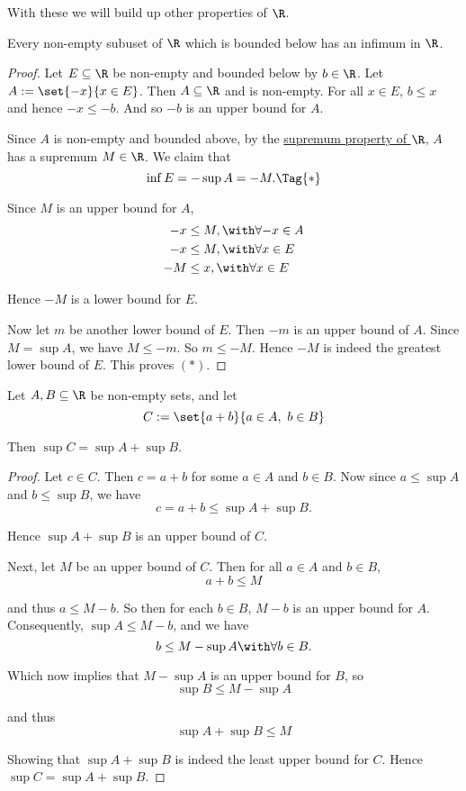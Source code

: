 With these we will build up other properties of $\R$.

\label{ab2a2fe}

Every non-empty subuset of $\R$ which is bounded below has an infimum in $\R$.

\begin{proof}

  Let $E\subseteq\R$ be non-empty and bounded below by $b\in\R$. Let
  $A:=\set{-x}{x\in E}$. Then $A\subseteq\R$ and is non-empty. For all $x\in E$,
  $b\leq x$ and hence $-x\leq-b$. And so $-b$ is an upper bound for $A$.

  Since $A$ is non-empty and bounded above, by the \href{f330cf9}{supremum
  property of $\R$}, $A$ has a supremum $M\in\R$. We claim that
  \begin{equation*}
    \inf E=-\sup A=-M.\Tag{*}
  \end{equation*}

  Since $M$ is an upper bound for $A$,
  \begin{align*}
    -x &\leq M,\with\forall{-x}\in A \\
    -x &\leq M,\with\forall{x}\in E  \\
    -M &\leq x,\with\forall{x}\in E
  \end{align*}

  Hence $-M$ is a lower bound for $E$.

  Now let $m$ be another lower bound of $E$. Then $-m$ is an upper bound of $A$.
  Since $M=\sup A$, we have $M\leq-m$. So $m\leq-M$. Hence $-M$ is indeed the
  greatest lower bound of $E$. This proves $(*)$.
\end{proof}

\label{f426fd0}

Let $A,B\subseteq\R$ be non-empty sets, and let
$$
  C:=\set{a+b}{a\in A,\ b\in B}
$$

Then $\sup C=\sup A+\sup B$.

\begin{proof}
  Let $c\in C$. Then $c=a+b$ for some $a\in A$ and $b\in B$. Now since
  $a\leq\sup A$ and $b\leq\sup B$, we have
  $$
    c=a+b\leq\sup A+\sup B.
  $$

  Hence $\sup A+\sup B$ is an upper bound of $C$.

  Next, let $M$ be an upper bound of $C$. Then for all $a\in A$ and $b\in B$,
  $$
    a+b\leq M
  $$

  and thus $a\leq M-b$. So then for each $b\in B$, $M-b$ is an upper bound for
  $A$. Consequently, $\sup A\leq M-b$, and we have
  $$
    b\leq M-\sup A\with\forall b\in B.
  $$

  Which now implies that $M-\sup A$ is an upper bound for $B$, so
  $$
    \sup B\leq M-\sup A
  $$

  and thus
  $$
    \sup A+\sup B\leq M
  $$

  Showing that $\sup A+\sup B$ is indeed the least upper bound for $C$. Hence
  $\sup C=\sup A+\sup B$.
\end{proof}
